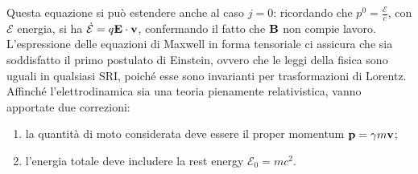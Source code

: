 Questa equazione si può estendere anche al caso $ j = 0 $: ricordando che $ p^0 = \frac{\mathcal{E}}{c} $, con $ \mathcal{E} $ energia, si ha $ \dot{\mathcal{E}} = q\mathbf{E}\cdot\mathbf{v} $, confermando il fatto che $ \mathbf{B} $ non compie lavoro.\\
L'espressione delle equazioni di Maxwell in forma tensoriale ci assicura che sia soddisfatto il primo postulato di Einstein, ovvero che le leggi della fisica sono uguali in qualsiasi SRI, poiché esse sono invarianti per trasformazioni di Lorentz.\\
Affinché l'elettrodinamica sia una teoria pienamente relativistica, vanno apportate due correzioni:
\begin{enumerate}
	\item la quantità di moto considerata deve essere il proper momentum $ \mathbf{p} = \gamma m \mathbf{v} $;
	\item l'energia totale deve includere la rest energy $ \mathcal{E}_0 = mc^2 $.
\end{enumerate}










